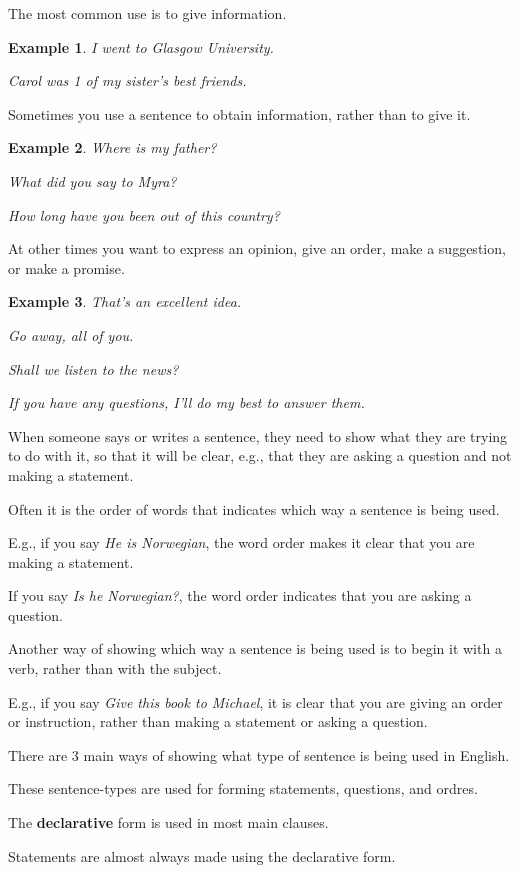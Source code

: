 \documentclass[oneside]{book}
\numberwithin{equation}{section}
\newtheorem{example}{Example}[section]
\begin{document}
%
The most common use is to give information.
\begin{example}
    I went to Glasgow University.
    
    Carol was 1 of my sister's best friends.
\end{example}
Sometimes you use a sentence to obtain information, rather than to give it.
\begin{example}
    Where is my father?
    
    What did you say to Myra?
    
    How long have you been out of this country?
\end{example}
At other times you want to express an opinion, give an order, make a suggestion, or make a promise.
\begin{example}
    That's an excellent idea.
    
    Go away, all of you.
    
    Shall we listen to the news?
    
    If you have any questions, I'll do my best to answer them.
\end{example}
When someone says or writes a sentence, they need to show what they are trying to do with it, so that it will be clear, e.g., that they are asking a question and not making a statement.

%
\noindent{} Often it is the order of words that indicates which way a sentence is being used.

E.g., if you say \textit{He is Norwegian}, the word order makes it clear that you are making a statement.

If you say \textit{Is he Norwegian?}, the word order indicates that you are asking a question.

%
Another way of showing which way a sentence is being used is to begin it with a verb, rather than with the subject.

E.g., if you say \textit{Give this book to Michael}, it is clear that you are giving an order or instruction, rather than making a statement or asking a question.

%
\noindent{} There are 3 main ways of showing what type of sentence is being used in English.

These sentence-types are used for forming statements, questions, and ordres.

%
The \textbf{declarative} form is used in most main clauses.

Statements are almost always made using the declarative form.
\end{document}

